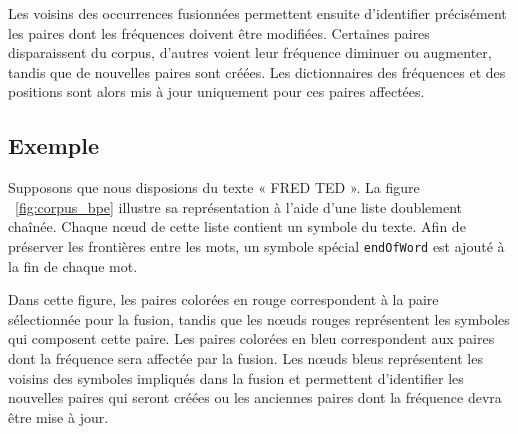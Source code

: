 \documentclass[12pt,a4paper]{report}
\begin{document}
	Les voisins des occurrences fusionnées permettent ensuite d’identifier précisément les paires dont les fréquences doivent être modifiées. Certaines paires disparaissent du corpus, d’autres voient leur fréquence diminuer ou augmenter, tandis que de nouvelles paires sont créées. Les dictionnaires des fréquences et des positions sont alors mis à jour uniquement pour ces paires affectées.	
		
	\subsection{Exemple}
	
	Supposons que nous disposions du texte « FRED TED ». La figure ~\ref{fig:corpus_bpe} illustre sa représentation à l’aide d’une liste doublement chaînée. Chaque nœud de cette liste contient un symbole du texte. Afin de préserver les frontières entre les mots, un symbole spécial \texttt{endOfWord} est ajouté à la fin de chaque mot.
	
	Dans cette figure, les paires colorées en rouge correspondent à la paire sélectionnée pour la fusion, tandis que les nœuds rouges représentent les symboles qui composent cette paire. Les paires colorées en bleu correspondent aux paires dont la fréquence sera affectée par la fusion. Les nœuds bleus représentent les voisins des symboles impliqués dans la fusion et permettent d’identifier les nouvelles paires qui seront créées ou les anciennes paires dont la fréquence devra être mise à jour.
	
\end{document}
